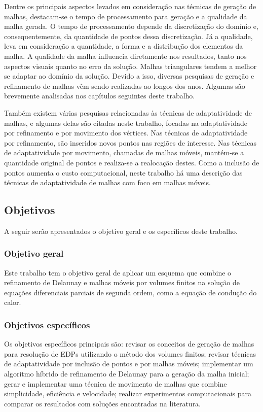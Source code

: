 Dentre os principais aspectos levados em consideração nas técnicas de geração de malhas, destacam-se o tempo de processamento para geração e a qualidade da malha gerada. O tempo de processamento depende da discretização do domínio e, consequentemente, da quantidade de pontos dessa discretização. Já a qualidade, leva em consideração a quantidade, a forma e a distribução dos elementos da malha. A qualidade da malha influencia diretamente nos resultados, tanto nos aspectos visuais quanto no erro da solução. Malhas triangulares tendem a melhor se adaptar ao domínio da solução. Devido a isso, diversas pesquisas de geração e refinamento de malhas vêm sendo realizadas ao longos dos anos. Algumas são brevemente analisadas nos capítulos seguintes deste trabalho.

Também existem várias pesquisas relacionadas às técnicas de adaptatividade de malhas, e algumas delas são citadas neste trabalho, focadas na adaptatividade por refinamento e por movimento dos vértices. Nas técnicas de adaptatividade por refinamento, são inseridos novos pontos nas regiões de interesse. Nas técnicas de adaptatividade por movimento, chamadas de malhas móveis, mantém-se a quantidade original de pontos e realiza-se a realocação destes. Como a inclusão de pontos aumenta o custo computacional, neste trabalho há uma descrição das técnicas de adaptatividade de malhas com foco em malhas móveis.

\subsection{Objetivos}

A seguir serão apresentados o objetivo geral e os específicos deste trabalho.

\subsubsection{Objetivo geral}

Este trabalho tem o objetivo geral de aplicar um esquema que combine o refinamento de Delaunay e malhas móveis por volumes finitos na solução de equações diferenciais parciais de segunda ordem, como a equação de condução do calor.

\subsubsection{Objetivos específicos}

Os objetivos específicos principais são: revisar os conceitos de geração de malhas para resolução de EDPs utilizando o método dos volumes finitos; revisar técnicas de adaptatividade por inclusão de pontos e por malhas móveis; implementar um algoritmo híbrido de refinamento de Delaunay para a geração da malha inicial; gerar e implementar uma técnica de movimento de malhas que combine simplicidade, eficiência e velocidade; realizar experimentos computacionais para comparar os resultados com soluções encontradas na literatura.

